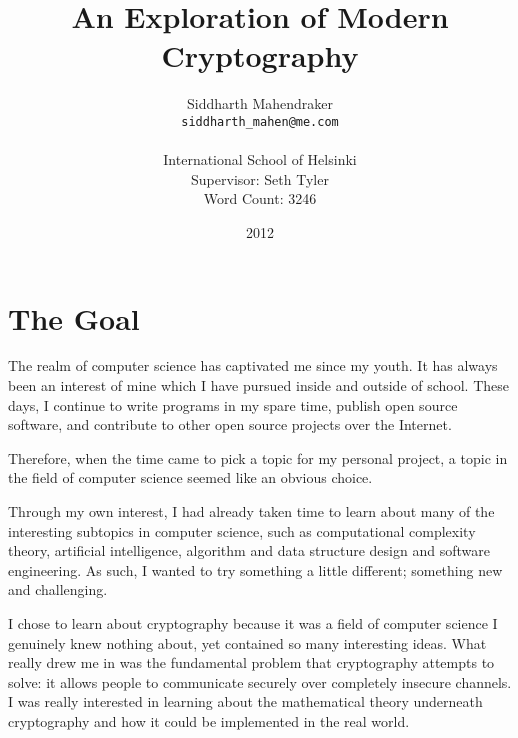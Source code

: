 \documentclass[12pt, a4paper, draft]{report}
\begin{document}
\renewcommand*\thesection{\arabic{section}}
\renewcommand{\cftsecfont}{\bfseries}
\setlength\cftbeforesecskip{5pt}

\title{An Exploration of Modern Cryptography}
\author{Siddharth Mahendraker\\
    \texttt{siddharth\_mahen@me.com}\\\\
    International School of Helsinki\\
    Supervisor: Seth Tyler\\
    Word Count: 3246}
\date{2012}
\maketitle

\setcounter{page}{1}
\tableofcontents
\clearpage

\section*{The Goal}
\setcounter{page}{1}


The realm of computer science has captivated me since my youth. It has
always been an interest of mine which I have pursued inside and outside
of school. These days, I continue to write programs in my spare time,
publish open source software, and contribute to other open source
projects over the Internet.

Therefore, when the time came to pick a topic for my personal project,
a topic in the field of computer science seemed like an obvious choice.

Through my own interest, I had already taken time to learn about many
of the interesting subtopics in computer science, such as computational
complexity theory, artificial intelligence, algorithm and data structure
design and software engineering. As such, I wanted to try something
a little different; something new and challenging.

I chose to learn about cryptography because it was a field of computer
science I genuinely knew nothing about, yet contained so many interesting
ideas. What really drew me in was the fundamental problem that cryptography
attempts to solve: it allows people to communicate securely over completely
insecure channels. I was really interested in learning about the mathematical
theory underneath cryptography and how it could be implemented in the real
world.
\end{document}
